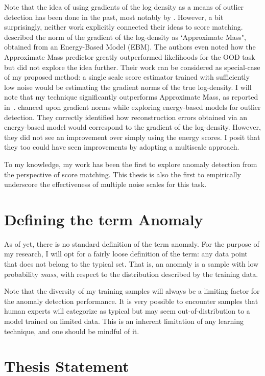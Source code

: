 Note that the idea of using gradients of the log density  as a means of outlier detection has been done in the past, most notably by \cite{Grathwohl2020Your, pmlr-v48-zhai16}. However, a bit surprisingly, neither work explicitly connected their ideas to score matching. \cite{Grathwohl2020Your} described the norm of the gradient of the log-density as `Approximate Mass", obtained from an Energy-Based Model (EBM). The authors even noted how the Approximate Mass predictor greatly outperformed likelihoods for the OOD task but did not explore the idea further. Their work can be considered as special-case of my proposed method: a single scale score estimator trained with sufficiently low  noise would be estimating the gradient norms of the true log-density. I will note that my technique significantly outperforms Approximate Mass, as reported in~\cite{mahmood2021multiscale}. \cite{pmlr-v48-zhai16} chanced upon gradient norms while exploring energy-based models for outlier detection. They correctly identified how reconstruction errors obtained via an energy-based model would correspond to the gradient of the log-density. However, they did not see an improvement over simply using the energy scores. I posit that they too could have seen improvements by adopting a multiscale approach. 

To my knowledge, my work has been the first to explore anomaly detection from the perspective of score matching. This thesis is also the first to empirically underscore the effectiveness of multiple noise scales for this task.


\section{Defining the term Anomaly}
As of yet, there is no standard definition of the term anomaly. 
For the purpose of my research, I will opt for a fairly loose definition of the term: any data point that does not belong to the typical set. That is, an anomaly is a sample with low probability \textit{mass}, with respect to the distribution described by the training data. 

Note that the diversity of my training samples will always be a limiting factor for the anomaly detection performance. It is very possible to encounter samples that human experts will categorize as typical but may seem out-of-distribution to a model trained on limited data. This is an inherent limitation of any learning technique, and one should be mindful of it.

\section{Thesis Statement}

